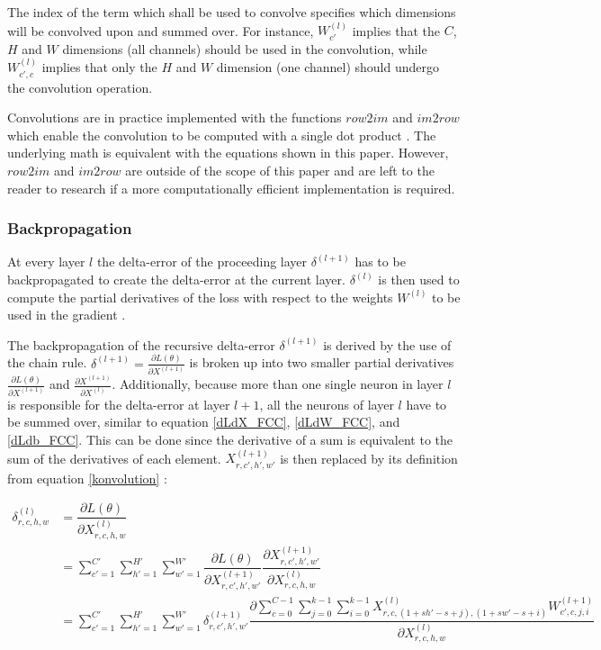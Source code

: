 \documentclass[paperwidth=48in,paperheight=48in, fontscale=0.4166666666666, landscape]{baposter}
\newcommand*{\pd}[2]{\ensuremath{\dfrac{\partial #1}{\partial #2}}}
\newcommand*{\inpd}[2]{\ensuremath{\frac{\partial #1}{\partial #2}}}
\begin{document}
\begin{poster}
{The index of the term which shall be used to convolve specifies which dimensions will be convolved upon and summed over. For instance, $W^{(l)}_{c'}$ implies that the $C$, $H$ and $W$ dimensions (all channels) should be used in the convolution, while $W^{(l)}_{c', c}$ implies that only the $H$ and $W$ dimension (one channel) should undergo the convolution operation.

Convolutions are in practice implemented with the functions $row2im$ and $im2row$ which enable the convolution to be computed with a single dot product \cite{cs231n} \cite{convmath} \cite{convarithmetic}. The underlying math is equivalent with the equations shown in this paper. However, $row2im$ and $im2row$ are outside of the scope of this paper and are left to the reader to research if a more computationally efficient implementation is required. 

\subsubsection{Backpropagation}
At every layer $l$ the delta-error of the proceeding layer $\delta^{(l+1)}$ has to be backpropagated to create the delta-error at the current layer. $\delta^{(l)}$ is then used to compute the partial derivatives of the loss with respect to the weights $W^{(l)}$ to be used in the gradient \cite{cs231n} \cite{convmath}. 
 
The backpropagation of the recursive delta-error $\delta^{(l+1)}$ is derived by the use of the chain rule. $\delta^{(l+1)} = \inpd{L(\theta)}{X^{(l+1)}}$ is broken up into two smaller partial derivatives $\inpd{L(\theta)}{X^{(l+1)}}$ and $\inpd{X^{(l+1)}}{X^{(l)}}$. Additionally, because more than one single neuron in layer $l$ is responsible for the delta-error at layer $l+1$, all the neurons of layer $l$ have to be summed over, similar to equation \eqref{dLdX_FCC}, \eqref{dLdW_FCC}, and \eqref{dLdb_FCC}. This can be done since the derivative of a sum is equivalent to the sum of the derivatives of each element. $X^{(l+1)}_{r,c',h',w'}$ is then replaced by its definition from equation \eqref{konvolution} \cite{convmath} \cite{webconv1} \cite{webconv2} \cite{webconv3}: 

\begin{equation}\label{konvolutionbackprop}
\begin{split}
	\delta^{(l)}_{r,c,h,w}
		& = \pd{L(\theta)}{X^{(l)}_{r,c,h,w}} \\
		& = \sum^{C' }_{c'=1} \sum^{H' }_{h'=1} \sum^{W' }_{w'=1} \pd{L(\theta)}{X^{(l+1)}_{r,c',h',w'}} \pd{X^{(l+1)}_{r,c',h',w'}}{X^{(l)}_{r,c,h,w}} \\
		& = \sum^{C' }_{c'=1} \sum^{H' }_{h'=1} \sum^{W' }_{w'=1} \delta^{(l+1)}_{r,c',h',w'} \pd{\sum^{C-1 }_{c=0} \sum^{k-1 }_{j=0} \sum^{k-1 }_{i=0} X^{(l)}_{r, c, (1+sh'-s+j), (1+sw'-s+i)}W^{(l+1)}_{c', c, j, i}}{X^{(l)}_{r,c,h,w}}
\end{split}
\end{equation}

}
\end{poster}
\end{document}
